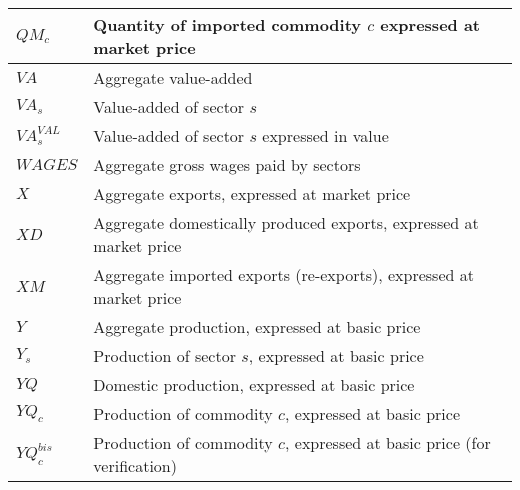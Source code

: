 \documentclass[12pt]{article}
\numberwithin{equation}{section}
\begin{document}
\begin{longtable}{@{}p{4cm}p{9cm}@{}}
 \midrule 
$QM_{c}$ & Quantity of imported commodity $c$ expressed at market price \\
 \midrule 
$VA$ & Aggregate value-added \\
 \midrule 
$VA_{s}$ & Value-added of sector $s$ \\
 \midrule 
$VA^{VAL}_{s}$ & Value-added of sector $s$ expressed in value \\
 \midrule 
$WAGES$ & Aggregate gross wages paid by sectors \\
 \midrule 
$X$ & Aggregate exports, expressed at market price \\
 \midrule 
$XD$ & Aggregate domestically produced exports, expressed at market price \\
 \midrule 
$XM$ & Aggregate imported exports (re-exports), expressed at market price \\
 \midrule 
$Y$ & Aggregate production, expressed at basic price \\
 \midrule 
$Y_{s}$ & Production of sector $s$, expressed at basic price \\
 \midrule 
$YQ$ & Domestic production, expressed at basic price \\
 \midrule 
$YQ_{c}$ & Production of commodity $c$, expressed at basic price \\
 \midrule 
$YQ^{bis}_{c}$ & Production of commodity $c$, expressed at basic price (for verification) \\
\end{longtable}
\end{document}
